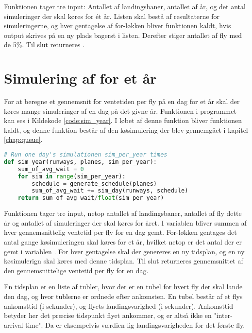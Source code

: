 Funktionen tager tre input: Antallet af landingsbaner, antallet af år, og det antal simuleringer der skal køres for ét år.
Listen  skal bestå af resultaterne for simuleringerne, og hver gentagelse af for-løkken bliver funktionen  kaldt, hvis output skrives på en ny plads bagerst i listen.
Derefter stiger antallet af fly med de 5\%.
Til slut returneres .

\section{Simulering af for et år}
For at beregne et gennemsnit for ventetiden per fly på en dag for et år skal der køres mange simuleringer af en dag på det givne år.
Funktionen  i programmet kan ses i Kildekode \ref{code:sim_year}.
I løbet af denne funktion bliver funktionen  kaldt, og denne funktion består af den køsimulering der blev gennemgået i kapitel \ref{chap:queue}. 

\begin{lstlisting}[language=Python, caption={sim\_year-funktionen i airplanes.py}, label=code:sim_year]
# Run one day's simulationen sim_per_year times
def sim_year(runways, planes, sim_per_year):
    sum_of_avg_wait = 0    
    for sim in range(sim_per_year):
        schedule = generate_schedule(planes)
        sum_of_avg_wait += sim_day(runways, schedule)
    return sum_of_avg_wait/float(sim_per_year)
\end{lstlisting}

Funktionen  tager tre input, netop antallet af landingsbaner, antallet af fly dette år og antallet af simuleringer der skal køres for året.
I variablen  bliver summen af hver gennemsnittelig ventetid per fly for en dag gemt.
For-løkken gentages det antal gange køsimuleringen skal køres for et år, hvilket netop er det antal der er gemt i variablen .
For hver gentagelse skal der genereres en ny tidsplan, og en ny køsimulerign skal køres med denne tidsplan.
Til slut returneres gennemsnittet af den gennemsnittelige ventetid per fly for en dag.

En tidsplan er en liste af tubler, hvor der er en tubel for hvert fly der skal lande den dag, og hvor tublerne er ordnede efter ankomsten. En tubel består af et flys ankomsttid (i sekunder), og flyets landingsvarighed (i sekunder).
Ankomsttid betyder her det præcise tidspunkt flyet ankommer, og er altså ikke en "inter-arrival time".
Da er eksempelvis værdien  lig landingsvarigheden for det første fly.

